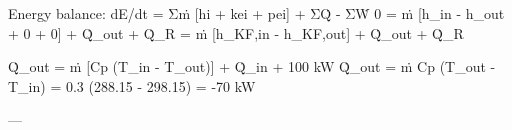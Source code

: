 Energy balance:  
dE/dt = Σṁ [hi + kei + pei] + ΣQ̇ - ΣẆ  
0 = ṁ [h_in - h_out + 0 + 0] + Q̇_out + Q̇_R  
= ṁ [h_KF,in - h_KF,out] + Q̇_out + Q̇_R  

Q̇_out = ṁ [Cp (T_in - T_out)] + Q̇_in + 100 kW  
Q̇_out = ṁ Cp (T_out - T_in) = 0.3 (288.15 - 298.15) = -70 kW  

---